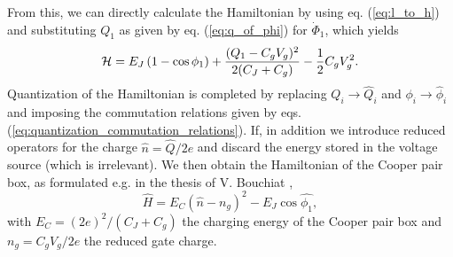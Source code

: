 %
From this, we can directly calculate the Hamiltonian by using eq. (\ref{eq:l_to_h}) and substituting $Q_1$ as given by eq. (\ref{eq:q_of_phi}) for $\dot{\Phi}_1$, which yields
%
\begin{equation}
\begin{mathcal}H\end{mathcal} = E_J\left(1-\cos{\phi_1}\right)+\frac{(Q_1-C_g V_g)^2}{2(C_J+C_g)}-\frac{1}{2}C_g V_g^2.
\end{equation}
%
Quantization of the Hamiltonian is completed by replacing $Q_i\to \hat{Q}_i$ and $\phi_i\to\hat{\phi}_i$ and imposing the commutation relations given by eqs. (\ref{eq:quantization_commutation_relations}). If, in addition we introduce reduced operators for the charge $\hat{n}=\hat{Q}/2e$ and discard the energy stored in the voltage source (which is irrelevant). We then obtain the Hamiltonian of the Cooper pair box, as formulated e.g. in the thesis of V. Bouchiat \citep{bouchiat_quantum_1998},
%
\begin{equation}
\hat{H} = E_C \left( \hat{n} - n_g\right)^2-E_J \cos{\hat{\phi_1}}, \label{eq:cpb_hamiltonian}
\end{equation}
%
with $E_C = (2e)^2 / (C_J+C_g)$ the charging energy of the Cooper pair box and $n_g=C_g V_g /2e $ the reduced gate charge.

\smallskip

